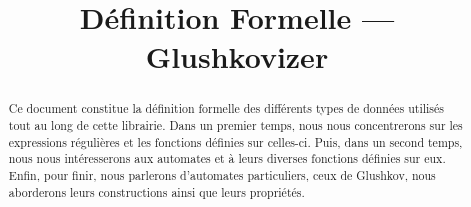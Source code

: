 \documentclass[12pt]{article}
\title{Définition Formelle --- Glushkovizer}
\author{}
\date{}
\theoremstyle{definition}
\begin{document}
\maketitle

\begin{abstract}
    Ce document constitue la définition formelle des différents types de
    données utilisés tout au long de cette librairie. Dans un premier temps,
    nous nous concentrerons sur les expressions régulières et les fonctions
    définies sur celles-ci. Puis, dans un second temps, nous nous intéresserons
    aux automates et à leurs diverses fonctions définies sur eux. Enfin, pour
    finir, nous parlerons d'automates particuliers, ceux de Glushkov, nous
    aborderons leurs constructions ainsi que leurs propriétés.
\end{abstract}

\newpage

\tableofcontents











\printbibliography[title=Bibliographie]
\end{document}
